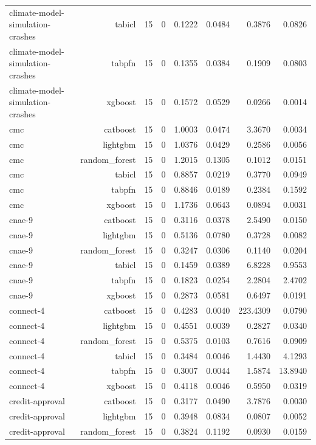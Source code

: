 \begin{table}[htbp]
\begin{tabular}{lrrrrrrr}
climate-model-simulation-crashes & tabicl & 15 & 0 & 0.1222 & 0.0484 & 0.3876 & 0.0826 \\
climate-model-simulation-crashes & tabpfn & 15 & 0 & 0.1355 & 0.0384 & 0.1909 & 0.0803 \\
climate-model-simulation-crashes & xgboost & 15 & 0 & 0.1572 & 0.0529 & 0.0266 & 0.0014 \\
cmc & catboost & 15 & 0 & 1.0003 & 0.0474 & 3.3670 & 0.0034 \\
cmc & lightgbm & 15 & 0 & 1.0376 & 0.0429 & 0.2586 & 0.0056 \\
cmc & random\_forest & 15 & 0 & 1.2015 & 0.1305 & 0.1012 & 0.0151 \\
cmc & tabicl & 15 & 0 & 0.8857 & 0.0219 & 0.3770 & 0.0949 \\
cmc & tabpfn & 15 & 0 & 0.8846 & 0.0189 & 0.2384 & 0.1592 \\
cmc & xgboost & 15 & 0 & 1.1736 & 0.0643 & 0.0894 & 0.0031 \\
cnae-9 & catboost & 15 & 0 & 0.3116 & 0.0378 & 2.5490 & 0.0150 \\
cnae-9 & lightgbm & 15 & 0 & 0.5136 & 0.0780 & 0.3728 & 0.0082 \\
cnae-9 & random\_forest & 15 & 0 & 0.3247 & 0.0306 & 0.1140 & 0.0204 \\
cnae-9 & tabicl & 15 & 0 & 0.1459 & 0.0389 & 6.8228 & 0.9553 \\
cnae-9 & tabpfn & 15 & 0 & 0.1823 & 0.0254 & 2.2804 & 2.4702 \\
cnae-9 & xgboost & 15 & 0 & 0.2873 & 0.0581 & 0.6497 & 0.0191 \\
connect-4 & catboost & 15 & 0 & 0.4283 & 0.0040 & 223.4309 & 0.0790 \\
connect-4 & lightgbm & 15 & 0 & 0.4551 & 0.0039 & 0.2827 & 0.0340 \\
connect-4 & random\_forest & 15 & 0 & 0.5375 & 0.0103 & 0.7616 & 0.0909 \\
connect-4 & tabicl & 15 & 0 & 0.3484 & 0.0046 & 1.4430 & 4.1293 \\
connect-4 & tabpfn & 15 & 0 & 0.3007 & 0.0044 & 1.5874 & 13.8940 \\
connect-4 & xgboost & 15 & 0 & 0.4118 & 0.0046 & 0.5950 & 0.0319 \\
credit-approval & catboost & 15 & 0 & 0.3177 & 0.0490 & 3.7876 & 0.0030 \\
credit-approval & lightgbm & 15 & 0 & 0.3948 & 0.0834 & 0.0807 & 0.0052 \\
credit-approval & random\_forest & 15 & 0 & 0.3824 & 0.1192 & 0.0930 & 0.0159 \\

\end{tabular}
\end{table}
